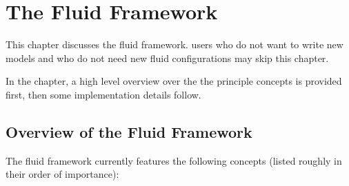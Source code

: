\chapter{The \Dumux Fluid Framework}
\label{sec:fluidframework}

This chapter discusses the \Dumux fluid framework. \Dumux users who
do not want to write new models and who do not need new fluid
configurations may skip this chapter.

In the chapter, a high level overview over the the principle concepts
is provided first, then some implementation details follow.

\section{Overview of the Fluid Framework}

The \Dumux fluid framework currently features the following concepts
(listed roughly in their order of importance):

